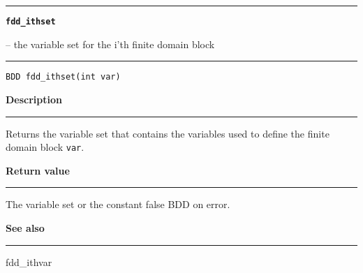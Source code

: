 \begin{minipage}{\textwidth}

\noindent\begin{minipage}{\textwidth}
\rule{\textwidth}{0.5mm}
{\tt\bf fdd\_ithset }
\--- the variable set for the i'th finite domain block  \hspace{\fill}
\\\rule[1.5ex]{\textwidth}{0.5mm}
\end{minipage}

\noindent\begin{verbatim}
BDD fdd_ithset(int var) 
\end{verbatim}

\vspace{\parsep}\noindent
{\bf Description}\\\rule[1.5ex]{\textwidth}{0.2mm}\vspace{-1.5ex}\setlength{\parindent}{1em}
Returns the variable set that contains the variables used to
           define the finite domain block {\tt var}. 

\setlength{\parindent}{0em}\vspace{\parsep}\vspace{\baselineskip}\noindent
{\bf Return value}\\\rule[1.5ex]{\textwidth}{0.2mm}\vspace{-1.5ex}
The variable set or the constant false BDD on error. 

\vspace{\parsep}\vspace{\baselineskip}\noindent
{\bf See also}\\\rule[1.5ex]{\textwidth}{0.2mm}\vspace{-1.5ex}
fdd\_ithvar 
\end{minipage}
\vspace{8ex}
